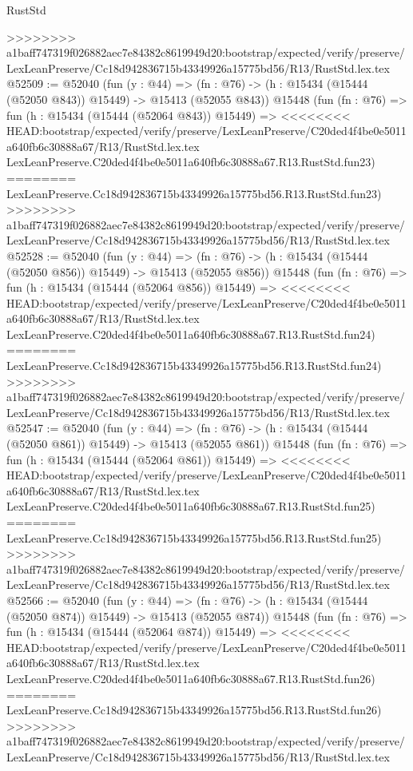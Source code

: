 \begin{lexlean}{RustStd}
\begin{coremodule}
{\begin{coremodule}
{{{{{{{{{{{{{{{{{{{{{{{{{{{{{{{{{{{{{{{{{{{{{{{{{{{{{{{{{{{{>>>>>>>> a1baff747319f026882aec7e84382c8619949d20:bootstrap/expected/verify/preserve/LexLeanPreserve/Cc18d942836715b43349926a15775bd56/R13/RustStd.lex.tex
@52509 := @52040
    (fun (y : @44) =>
    (fn : @76) -> (h : @15434 (@15444 (@52050 @843)) @15449) -> @15413 (@52055 @843))
    @15448
    (fun (fn : @76) =>
    fun (h : @15434 (@15444 (@52064 @843)) @15449) =>
<<<<<<<< HEAD:bootstrap/expected/verify/preserve/LexLeanPreserve/C20ded4f4be0e5011a640fb6c30888a67/R13/RustStd.lex.tex
    LexLeanPreserve.C20ded4f4be0e5011a640fb6c30888a67.R13.RustStd.fun23)
========
    LexLeanPreserve.Cc18d942836715b43349926a15775bd56.R13.RustStd.fun23)
>>>>>>>> a1baff747319f026882aec7e84382c8619949d20:bootstrap/expected/verify/preserve/LexLeanPreserve/Cc18d942836715b43349926a15775bd56/R13/RustStd.lex.tex
@52528 := @52040
    (fun (y : @44) =>
    (fn : @76) -> (h : @15434 (@15444 (@52050 @856)) @15449) -> @15413 (@52055 @856))
    @15448
    (fun (fn : @76) =>
    fun (h : @15434 (@15444 (@52064 @856)) @15449) =>
<<<<<<<< HEAD:bootstrap/expected/verify/preserve/LexLeanPreserve/C20ded4f4be0e5011a640fb6c30888a67/R13/RustStd.lex.tex
    LexLeanPreserve.C20ded4f4be0e5011a640fb6c30888a67.R13.RustStd.fun24)
========
    LexLeanPreserve.Cc18d942836715b43349926a15775bd56.R13.RustStd.fun24)
>>>>>>>> a1baff747319f026882aec7e84382c8619949d20:bootstrap/expected/verify/preserve/LexLeanPreserve/Cc18d942836715b43349926a15775bd56/R13/RustStd.lex.tex
@52547 := @52040
    (fun (y : @44) =>
    (fn : @76) -> (h : @15434 (@15444 (@52050 @861)) @15449) -> @15413 (@52055 @861))
    @15448
    (fun (fn : @76) =>
    fun (h : @15434 (@15444 (@52064 @861)) @15449) =>
<<<<<<<< HEAD:bootstrap/expected/verify/preserve/LexLeanPreserve/C20ded4f4be0e5011a640fb6c30888a67/R13/RustStd.lex.tex
    LexLeanPreserve.C20ded4f4be0e5011a640fb6c30888a67.R13.RustStd.fun25)
========
    LexLeanPreserve.Cc18d942836715b43349926a15775bd56.R13.RustStd.fun25)
>>>>>>>> a1baff747319f026882aec7e84382c8619949d20:bootstrap/expected/verify/preserve/LexLeanPreserve/Cc18d942836715b43349926a15775bd56/R13/RustStd.lex.tex
@52566 := @52040
    (fun (y : @44) =>
    (fn : @76) -> (h : @15434 (@15444 (@52050 @874)) @15449) -> @15413 (@52055 @874))
    @15448
    (fun (fn : @76) =>
    fun (h : @15434 (@15444 (@52064 @874)) @15449) =>
<<<<<<<< HEAD:bootstrap/expected/verify/preserve/LexLeanPreserve/C20ded4f4be0e5011a640fb6c30888a67/R13/RustStd.lex.tex
    LexLeanPreserve.C20ded4f4be0e5011a640fb6c30888a67.R13.RustStd.fun26)
========
    LexLeanPreserve.Cc18d942836715b43349926a15775bd56.R13.RustStd.fun26)
>>>>>>>> a1baff747319f026882aec7e84382c8619949d20:bootstrap/expected/verify/preserve/LexLeanPreserve/Cc18d942836715b43349926a15775bd56/R13/RustStd.lex.tex
}}}}}}}}}}}}}}}}}}}}}}}}}}}}}}}}}}}}}}}}}}}}}}}}}}}}}}}}}}}}
\end{coremodule}}
\end{coremodule}
\end{lexlean}
